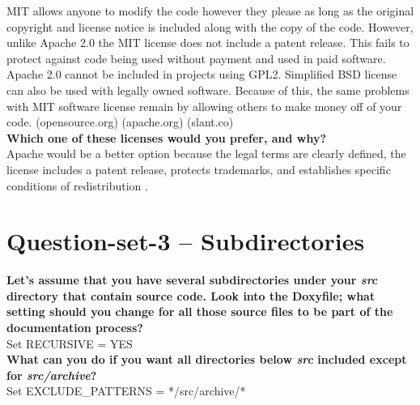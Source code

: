 \documentclass{article}
\begin{document}
MIT allows anyone to modify the code however they please as long as the original copyright and license notice is included along with the copy of the code. However, unlike Apache 2.0 the MIT license does not include a patent release. This fails to protect against code being used without payment and used in paid software.\\

Apache 2.0 cannot be included in projects using GPL2. Simplified BSD license can also be used with legally owned software. Because of this, the same problems with MIT software license remain by allowing others to make money off of your code. (opensource.org) (apache.org) (slant.co) \\

\textbf{Which one of these licenses would you prefer, and why?}\\

Apache would be a better option because the legal terms are clearly defined, the license includes a patent release, protects trademarks, and establishes specific conditions of redistribution . \\

\section{Question-set-3 -- Subdirectories}
\textbf{Let's assume that you have several subdirectories under your \textit{src} directory that contain source code. Look into the Doxyfile; what setting should you change for all those source files to be part of the documentation process?}\\

Set RECURSIVE = YES \\

\textbf{What can you do if you want all directories below \textit{src} included except for \textit{src/archive}?}\\

Set EXCLUDE\_PATTERNS = */src/archive/* \\
\end{document}
